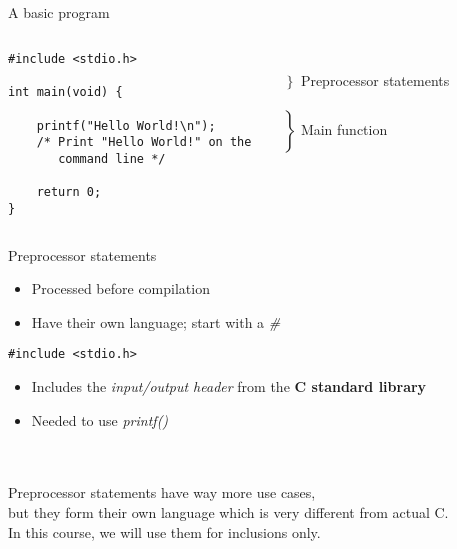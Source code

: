 \subsection{}
\begin{frame}[fragile]{A basic program}
	\begin{columns}[T]
		\begin{lstlisting}
#include <stdio.h>

int main(void) {

	printf("Hello World!\n");
	/* Print "Hello World!" on the
	   command line */

	return 0;
}
\end{lstlisting}
		
		\ \\$\left. \begin{array}{c}\\\end{array}\right\rbrace $ Preprocessor statements
		\ \\\ \\$\left. \begin{array}{c}\\\\\\\\\\\\\end{array}\right\rbrace $ Main function
	\end{columns}
\end{frame}
\begin{frame}[fragile]{Preprocessor statements}
	\begin{itemize}
		\item Processed before compilation
		\item Have their own language; start with a \textit{\#}
	\end{itemize}
	\begin{lstlisting}
#include <stdio.h>
\end{lstlisting}
	\begin{itemize}
		\item Includes the \textit{input/output header} from the \textbf{C standard library}
		\item Needed to use \textit{printf()}
	\end{itemize}\ \\ \ \\
	Preprocessor statements have way more use cases,\\
	but they form their own language which is very different from actual C.\\
	\bigskip
	In this course, we will use them for inclusions only.
\end{frame}
